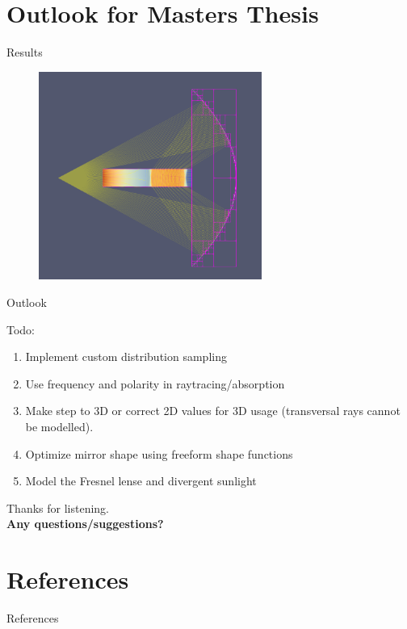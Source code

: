 \documentclass[aspectratio=43,t]{beamer}
\begin{document}
	\section{Outlook for Masters Thesis}

		\begin{frame}[fragile]{Results}
		\begin{figure}
		\centering
		\includegraphics[width=0.65\textwidth]{images/result.png}
		\end{figure}
    \end{frame}

		\begin{frame}[fragile]{Outlook}
    \begin{block}{Todo:}
      \begin{enumerate}
				\item<2-> Implement custom distribution sampling
        \item<3-> Use frequency and polarity in raytracing/absorption
				\item<4-> Make step to 3D or correct 2D values for 3D usage (transversal rays cannot
					be modelled).
        \item<5-> Optimize mirror shape using freeform shape functions
        \item<6-> Model the Fresnel lense and divergent sunlight
      \end{enumerate}
    \end{block}
    \end{frame}

  { %
    \begin{frame}[c,noframenumbering]
      \begin{center}
        Thanks for listening.\\
        {\bf Any questions/suggestions?}
      \end{center}
    \end{frame}

    \section*{References}
    \begin{frame}{References}
      \printbibliography
    \end{frame}
  }
	
\end{document}

